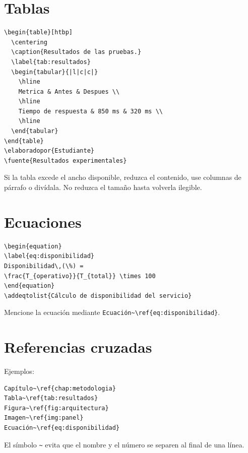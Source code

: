 \documentclass[12pt,a4paper,oneside]{report}
\begin{document}
\section{Tablas}

\begin{lstlisting}
\begin{table}[htbp]
  \centering
  \caption{Resultados de las pruebas.}
  \label{tab:resultados}
  \begin{tabular}{|l|c|c|}
    \hline
    Metrica & Antes & Despues \\
    \hline
    Tiempo de respuesta & 850 ms & 320 ms \\
    \hline
  \end{tabular}
\end{table}
\elaboradopor{Estudiante}
\fuente{Resultados experimentales}
\end{lstlisting}

Si la tabla excede el ancho disponible, reduzca el contenido, use columnas de párrafo o divídala. No reduzca el tamaño hasta volverla ilegible.

\section{Ecuaciones}

\begin{lstlisting}
\begin{equation}
\label{eq:disponibilidad}
Disponibilidad\,(\%) =
\frac{T_{operativo}}{T_{total}} \times 100
\end{equation}
\addeqtolist{Cálculo de disponibilidad del servicio}
\end{lstlisting}

Mencione la ecuación mediante \texttt{Ecuación\textasciitilde\textbackslash ref\{eq:disponibilidad\}}.

\section{Referencias cruzadas}

Ejemplos:

\begin{lstlisting}
Capítulo~\ref{chap:metodologia}
Tabla~\ref{tab:resultados}
Figura~\ref{fig:arquitectura}
Imagen~\ref{img:panel}
Ecuación~\ref{eq:disponibilidad}
\end{lstlisting}

El símbolo \texttt{\textasciitilde} evita que el nombre y el número se separen al final de una línea.
\end{document}
